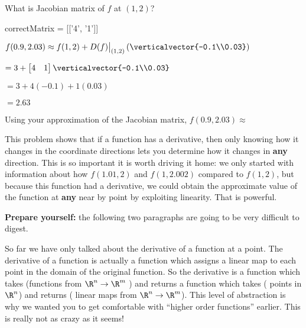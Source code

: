 \documentclass{ximera}
\begin{document}
\begin{question}
\begin{solution}
	What is Jacobian matrix of $f$ at $(1,2)$?
	\begin{matrix-answer}[name = M]
		correctMatrix = [['4', '1']]
	\end{matrix-answer}
\end{solution}

\begin{solution} 
	\begin{hint}
		$f(0.9,2.03) \approx f(1,2) +D(f)\big|_{(1,2)}\left(\verticalvector{-0.1\\0.03}\right)$
	\end{hint}
	\begin{hint}
		$ = 3 + \begin{bmatrix} 4 & 1\end{bmatrix}\verticalvector{-0.1\\0.03}$
	\end{hint}
	\begin{hint}
		$ = 3+4(-0.1)+1(0.03)$
		
		$= 2.63$
	\end{hint}
	Using your approximation of the  Jacobian matrix, $f(0.9,2.03) \approx $ 
\end{solution}
This problem shows that if a function has a derivative, then only knowing how it changes in the coordinate directions lets you determine how it changes in \textbf{any} 
direction.  This is so important it is worth driving it home:  we only started with information about how $f(1.01,2)$ and $f(1,2.002)$ compared to $f(1,2)$, but because
this function had a derivative, we could obtain the approximate value of the function at \textbf{any} near by point by exploiting linearity.  That is powerful.
\end{question}

\textbf{Prepare yourself:}  the following two paragraphs are going to be very difficult to digest.

So far we have only talked about the derivative of a function at a point.  The derivative of a function is actually a function which assigns a linear map
to each point in the domain of the original function.   So the derivative is a function which takes (functions from $\R^n \to \R^m$ ) and 
returns  a function which takes ( points in $\R^n$) and  returns ( linear maps from $\R^n \to \R^m$).    This level of abstraction is why we 
wanted you to get comfortable with ``higher order functions'' earlier.  This is really not as crazy as it seems!
\end{document}
